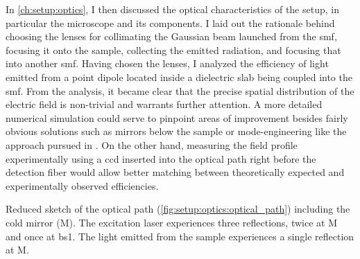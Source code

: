 In \cref{ch:setup:optics}, I then discussed the optical characteristics of the setup, in particular the microscope and its components.
I laid out the rationale behind choosing the lenses for collimating the Gaussian beam launched from the \gls{smf}, focusing it onto the sample, collecting the emitted radiation, and focusing that into another \gls{smf}.
Having chosen the lenses, I analyzed the efficiency of light emitted from a point dipole located inside a dielectric slab being coupled into the \gls{smf}.
From the analysis, it became clear that the precise spatial distribution of the electric field is non-trivial and warrants further attention.
A more detailed numerical simulation could serve to pinpoint areas of improvement besides fairly obvious solutions such as mirrors below the sample or mode-engineering like the approach pursued in .
On the other hand, measuring the field profile experimentally using a \gls{ccd} inserted into the optical path right before the detection fiber would allow better matching between theoretically expected and experimentally observed efficiencies.

\begin{marginfigure}[*-16]
    
    \caption[]{
        Reduced sketch of the optical path (\cf \cref{fig:setup:optics:optical_path}) including the cold mirror (M).
        The excitation laser experiences three reflections, twice at M and once at \acrshort{bs}1.
        The light emitted from the sample experiences a single reflection at M.
    }
    \label{fig:setup:conclusion:optical_path_reduced}
\end{marginfigure}

